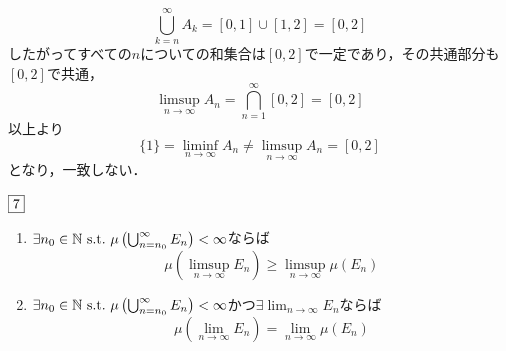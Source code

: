 \documentclass[dvipdfmx, leqno]{jsreport}
\begin{document}
\begin{souanswer}
\begin{enumerate}
\begin{equation}
    \bigcup_{k= n}^\infty A_k= [0, 1]\cup [1, 2]= [0, 2]
\end{equation}
    したがってすべての$n$についての和集合は$[0, 2]$で一定であり，その共通部分も$[0, 2]$で共通，
\begin{equation}
    \limsup_{n\to \infty} A_n= \bigcap_{n= 1}^\infty [0, 2]= [0, 2]
\end{equation}
    以上より
\begin{equation}
    \{1\}= \liminf_{n\to \infty} A_n\ne \limsup_{n\to \infty} A_n= [0, 2]
\end{equation}
    となり，一致しない．
\end{enumerate}
\end{souanswer}
\begin{tcolorbox}$\fbox{7}$
\begin{enumerate}
    \item $\exists n_0\in \mathbb{N} \ \mathrm{s.t.}\ \mu\left(\bigcup_{n= n_0}^\infty E_n\right)< \infty$ならば
\begin{equation}
    \mu\left(\limsup_{n\to \infty} E_n\right)\ge \limsup_{n\to \infty} \mu(E_n)
\end{equation}
    \item $\exists n_0\in \mathbb{N} \ \mathrm{s.t.}\ \mu\left(\bigcup_{n= n_0}^\infty E_n\right)< \infty$かつ$\exists \lim_{n\to \infty} E_n$ならば
\begin{equation}
    \mu\left(\lim_{n\to \infty} E_n\right)= \lim_{n\to \infty} \mu(E_n)
\end{equation}
\end{enumerate}
\end{tcolorbox}
\end{document}
